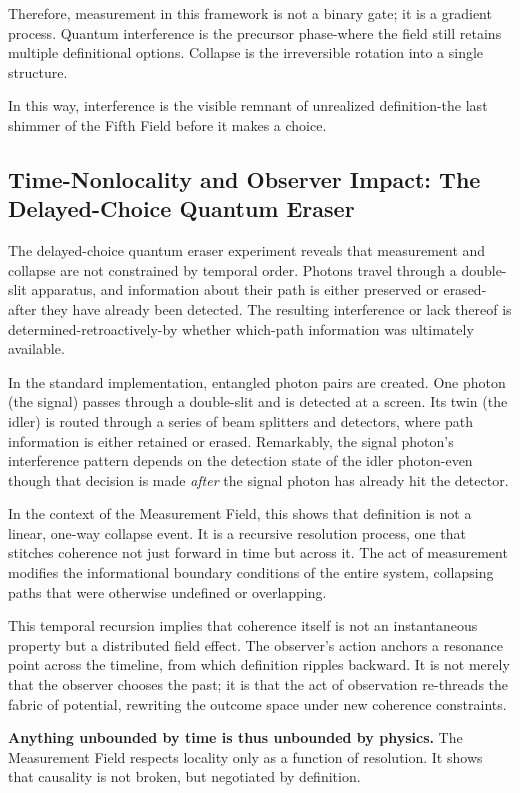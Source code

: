 Therefore, measurement in this framework is not a binary gate; it is a gradient process. Quantum interference is the precursor phase-where the field still retains multiple definitional options. Collapse is the irreversible rotation into a single structure.

In this way, interference is the visible remnant of unrealized definition-the last shimmer of the Fifth Field before it makes a choice.


\subsection{Time-Nonlocality and Observer Impact: The Delayed-Choice Quantum Eraser}

The delayed-choice quantum eraser experiment reveals that measurement and collapse are not constrained by temporal order. Photons travel through a double-slit apparatus, and information about their path is either preserved or erased-after they have already been detected. The resulting interference or lack thereof is determined-retroactively-by whether which-path information was ultimately available.

In the standard implementation, entangled photon pairs are created. One photon (the signal) passes through a double-slit and is detected at a screen. Its twin (the idler) is routed through a series of beam splitters and detectors, where path information is either retained or erased. Remarkably, the signal photon's interference pattern depends on the detection state of the idler photon-even though that decision is made \textit{after} the signal photon has already hit the detector.

In the context of the Measurement Field, this shows that definition is not a linear, one-way collapse event. It is a recursive resolution process, one that stitches coherence not just forward in time but across it. The act of measurement modifies the informational boundary conditions of the entire system, collapsing paths that were otherwise undefined or overlapping.

This temporal recursion implies that coherence itself is not an instantaneous property but a distributed field effect. The observer's action anchors a resonance point across the timeline, from which definition ripples backward. It is not merely that the observer chooses the past; it is that the act of observation re-threads the fabric of potential, rewriting the outcome space under new coherence constraints.

\textbf{Anything unbounded by time is thus unbounded by physics.} The Measurement Field respects locality only as a function of resolution. It shows that causality is not broken, but negotiated by definition.

